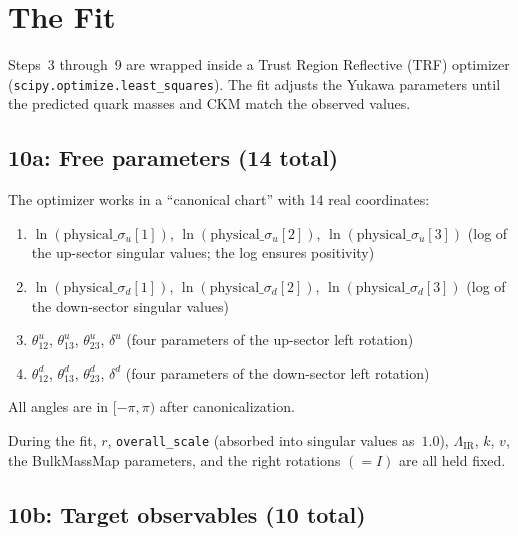 \documentclass[11pt]{article}
\newcommand{\LamIR}{\Lambda_{\mathrm{IR}}}
\begin{document}
\section{The Fit}
\label{sec:step10}

Steps~3 through~9 are wrapped inside a Trust Region Reflective (TRF) optimizer
(\texttt{scipy.optimize.least\_squares}).  The fit adjusts the Yukawa
parameters until the predicted quark masses and CKM match the observed values.

\subsection{10a: Free parameters (14 total)}
\label{sec:step10a}

The optimizer works in a ``canonical chart'' with 14 real coordinates:

\begin{enumerate}
  \item[1--3.] $\ln(\text{physical\_}\sigma_u[1])$,
    $\ln(\text{physical\_}\sigma_u[2])$,
    $\ln(\text{physical\_}\sigma_u[3])$
    (log of the up-sector singular values; the log ensures positivity)
  \item[4--6.] $\ln(\text{physical\_}\sigma_d[1])$,
    $\ln(\text{physical\_}\sigma_d[2])$,
    $\ln(\text{physical\_}\sigma_d[3])$
    (log of the down-sector singular values)
  \item[7--10.] $\theta_{12}^u$, $\theta_{13}^u$, $\theta_{23}^u$, $\delta^u$
    (four parameters of the up-sector left rotation)
  \item[11--14.] $\theta_{12}^d$, $\theta_{13}^d$, $\theta_{23}^d$, $\delta^d$
    (four parameters of the down-sector left rotation)
\end{enumerate}

All angles are in $[-\pi,\pi)$ after canonicalization.

During the fit, $r$, \texttt{overall\_scale} (absorbed into singular
values as~$1.0$), $\LamIR$, $k$, $v$, the BulkMassMap parameters, and the
right rotations $(= I)$ are all held fixed.

\subsection{10b: Target observables (10 total)}
\label{sec:step10b}
\end{document}
